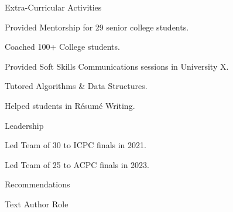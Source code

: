 \documentclass{resume} %
\begin{document}

\begin{rSection}{Extra-Curricular Activities}
    \begin{rItemize}
        \item Provided Mentorship for 29 senior college students.
        \item Coached 100+ College students.
        \item Provided Soft Skills Communications sessions in University X.
        \item Tutored Algorithms \& Data Structures.
        \item Helped students in Résumé Writing.
    \end{rItemize}
\end{rSection}


\begin{rSection}{Leadership}
    \begin{rItemize}
        \item Led Team of 30 to ICPC finals in 2021.
        \item Led Team of 25 to ACPC finals in 2023.
    \end{rItemize}
\end{rSection}


\begin{rSection}{Recommendations}
    \begin{recommendation}
        {Text}
        {Author}
        {Role}
    \end{recommendation}
\end{rSection}


\end{document}
